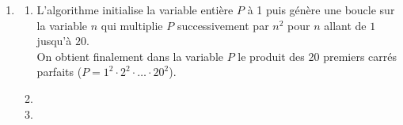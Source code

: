 \begin{enumerate}[label=\thechapter.\arabic*., font=\bfseries, itemsep=10mm,labelsep*=3mm,left=0mm]
\begin{tasks}[label=\alph*)]
\task
\begin{minipage}[t][][b]{1\textwidth}
\begin{affichagealgorithme}{0.35}
\textbf{Variable :} k()\\
\textbf{Début}\\
\\
\end{affichagealgorithme}\end{minipage}

\task*
\begin{minipage}[t][][b]{1\textwidth}
\end{minipage}
\end{tasks}



\item
\begin{enumerate}[label=\alph*)]
\item L'algorithme initialise la variable entière $P$ à 1 puis génère une boucle sur la variable $n$ qui multiplie $P$ successivement par $n^2$ pour $n$ allant de $1$ jusqu'à $20$. \\
On obtient finalement dans la variable $P$ le produit des 20 premiers carrés parfaits ($P=1^2\cdot 2^2\cdot\ldots\cdot 20^2$).

\item  \begin{minipage}[t][][b]{1\textwidth}
\end{minipage}\clearpage

\item\begin{minipage}[t][][b]{1\textwidth}\vspace{-5mm}
\end{minipage}
\end{enumerate}




\end{enumerate}
